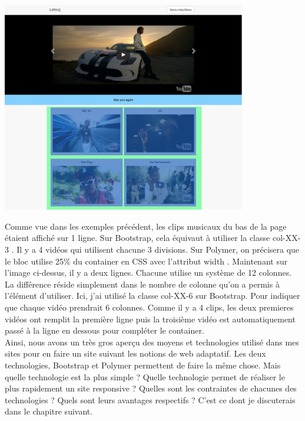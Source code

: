 \documentclass{article}
\begin{document}
\begin{center}
\vspace{0.5cm}
\includegraphics[width=0.8\textwidth]{p13}
\vspace{0.5cm}\\
\end{center}

Comme vue dans les exemples pr\'ec\'edent, les clips musicaux du bas de la page \'etaient affich\'e sur 1 ligne. Sur Bootstrap, cela \'equivaut \`a utiliser la classe \og col-XX-3 \fg{}. Il y a 4 vid\'eos qui utilisent chacune 3 divisions. Sur Polymer, on pr\'ecisera que le bloc utilise 25\% du container en CSS avec l'attribut \og width \fg{}. Maintenant sur l'image ci-dessus, il y a deux lignes. Chacune utilise un syst\`eme de 12 colonnes. La diff\'erence r\'eside simplement dans le nombre de colonne qu'on a permis \`a l'\'el\'ement d'utiliser. Ici, j'ai utilis\'e la classe \og col-XX-6 \fg{} sur Bootstrap. Pour indiquer que chaque vid\'eo prendrait 6 colonnes. Comme il y a 4 clips, les deux premieres vid\'eos ont remplit la premi\`ere ligne puis la troisi\`eme vid\'eo est automatiquement pass\'e \`a la ligne en dessous pour compl\'eter le container.\\

Ainsi, nous avons un tr\`es gros aper\c{c}u des moyens et technologies utilis\'e dans mes sites pour en faire un site suivant les notions de web adaptatif. Les deux technologies, Bootstrap et Polymer permettent de faire la m\^eme chose. Mais quelle technologie est la plus simple ? Quelle technologie permet de r\'ealiser le plus rapidement un site responsive ? Quelles sont les contraintes de chacunes des technologies ? Quels sont leurs avantages respectifs ? C'est ce dont je discuterais dans le chapitre suivant.
\end{document}
